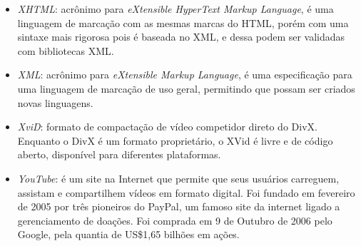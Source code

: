 \begin{itemize}
  \item \emph{XHTML}: acrônimo para \emph{eXtensible HyperText Markup Language}, é uma linguagem de marcação com as mesmas marcas do HTML, porém com uma sintaxe mais rigorosa pois é baseada no XML, e dessa podem ser validadas com bibliotecas XML.

  \item \emph{XML}: acrônimo para \emph{eXtensible Markup Language}, é uma especificação para uma linguagem de marcação de uso geral, permitindo que possam ser criados novas linguagens.

  \item \emph{XviD}: formato de compactação de vídeo competidor direto do DivX. Enquanto o DivX é um formato proprietário, o XVid é livre e de código aberto, disponível para diferentes plataformas.

  \item \emph{YouTube}: é um site na Internet que permite que seus usuários carreguem, assistam e compartilhem vídeos em formato digital. Foi fundado em fevereiro de 2005 por três pioneiros do PayPal, um famoso site da internet ligado a gerenciamento de doações. Foi comprada em 9 de Outubro de 2006 pelo Google, pela quantia de US\$1,65 bilhões em ações.

\end{itemize}

